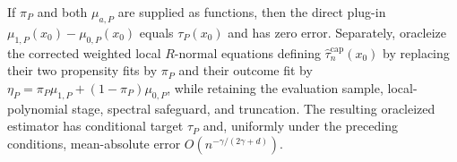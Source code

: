 If \(\pi_P\) and both \(\mu_{a,P}\) are supplied as functions, then the direct plug-in \(\mu_{1,P}(x_0)-\mu_{0,P}(x_0)\) equals \(\tau_P(x_0)\) and has zero error.  Separately, oracleize the corrected weighted local \(R\)-normal equations defining \(\widehat{\tau}^{\mathrm{cap}}_n(x_0)\) by replacing their two propensity fits by \(\pi_P\) and their outcome fit by \(\eta_P=\pi_P\mu_{1,P}+(1-\pi_P)\mu_{0,P}\), while retaining the evaluation sample, local-polynomial stage, spectral safeguard, and truncation.  The resulting oracleized estimator has conditional target \(\tau_P\) and, uniformly under the preceding conditions, mean-absolute error \(O(n^{-\gamma/(2\gamma+d)})\).